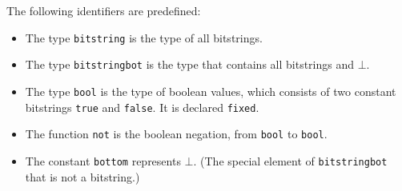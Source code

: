 The following identifiers are predefined:
\begin{itemize}

\item The type {\tt bitstring} is the type of all bitstrings.

\item The type {\tt bitstringbot} is the type that contains
all bitstrings and $\bot$.

\item The type {\tt bool} is the type of boolean values, which consists
of two constant bitstrings {\tt true} and {\tt false}.
It is declared {\tt fixed}.

\item The function {\tt not} is the boolean negation, from
{\tt bool} to {\tt bool}.

\item The constant {\tt bottom} represents $\bot$. (The special
element of {\tt bitstringbot} that is not a bitstring.)

\end{itemize}

